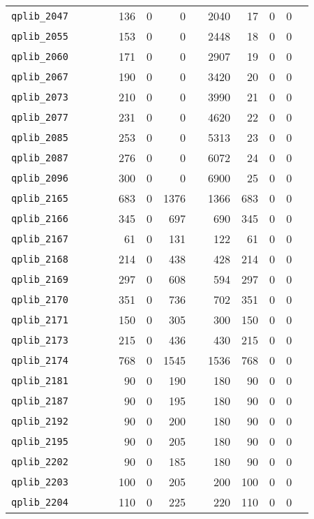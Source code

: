 {\begin{longtable}{lrrrrrrrrrrrr}
{\tt 	qplib\_2047	}	&		&		&	&	136	&	0	&	0	&	&	2040	&	17	&	0	&	0	\\
{\tt 	qplib\_2055	}	&		&		&	&	153	&	0	&	0	&	&	2448	&	18	&	0	&	0	\\
{\tt 	qplib\_2060	}	&		&		&	&	171	&	0	&	0	&	&	2907	&	19	&	0	&	0	\\
{\tt 	qplib\_2067	}	&		&		&	&	190	&	0	&	0	&	&	3420	&	20	&	0	&	0	\\
{\tt 	qplib\_2073	}	&		&		&	&	210	&	0	&	0	&	&	3990	&	21	&	0	&	0	\\
{\tt 	qplib\_2077	}	&		&		&	&	231	&	0	&	0	&	&	4620	&	22	&	0	&	0	\\
{\tt 	qplib\_2085	}	&		&		&	&	253	&	0	&	0	&	&	5313	&	23	&	0	&	0	\\
{\tt 	qplib\_2087	}	&		&		&	&	276	&	0	&	0	&	&	6072	&	24	&	0	&	0	\\
{\tt 	qplib\_2096	}	&		&		&	&	300	&	0	&	0	&	&	6900	&	25	&	0	&	0	\\
{\tt 	qplib\_2165	}	&		&		&	&	683	&	0	&	1376	&	&	1366	&	683	&	0	&	0	\\
{\tt 	qplib\_2166	}	&		&		&	&	345	&	0	&	697	&	&	690	&	345	&	0	&	0	\\
{\tt 	qplib\_2167	}	&		&		&	&	61	&	0	&	131	&	&	122	&	61	&	0	&	0	\\
{\tt 	qplib\_2168	}	&		&		&	&	214	&	0	&	438	&	&	428	&	214	&	0	&	0	\\
{\tt 	qplib\_2169	}	&		&		&	&	297	&	0	&	608	&	&	594	&	297	&	0	&	0	\\
{\tt 	qplib\_2170	}	&		&		&	&	351	&	0	&	736	&	&	702	&	351	&	0	&	0	\\
{\tt 	qplib\_2171	}	&		&		&	&	150	&	0	&	305	&	&	300	&	150	&	0	&	0	\\
{\tt 	qplib\_2173	}	&		&		&	&	215	&	0	&	436	&	&	430	&	215	&	0	&	0	\\
{\tt 	qplib\_2174	}	&		&		&	&	768	&	0	&	1545	&	&	1536	&	768	&	0	&	0	\\
{\tt 	qplib\_2181	}	&		&		&	&	90	&	0	&	190	&	&	180	&	90	&	0	&	0	\\
{\tt 	qplib\_2187	}	&		&		&	&	90	&	0	&	195	&	&	180	&	90	&	0	&	0	\\
{\tt 	qplib\_2192	}	&		&		&	&	90	&	0	&	200	&	&	180	&	90	&	0	&	0	\\
{\tt 	qplib\_2195	}	&		&		&	&	90	&	0	&	205	&	&	180	&	90	&	0	&	0	\\
{\tt 	qplib\_2202	}	&		&		&	&	90	&	0	&	185	&	&	180	&	90	&	0	&	0	\\
{\tt 	qplib\_2203	}	&		&		&	&	100	&	0	&	205	&	&	200	&	100	&	0	&	0	\\
{\tt 	qplib\_2204	}	&		&		&	&	110	&	0	&	225	&	&	220	&	110	&	0	&	0	\\

\end{longtable}}
